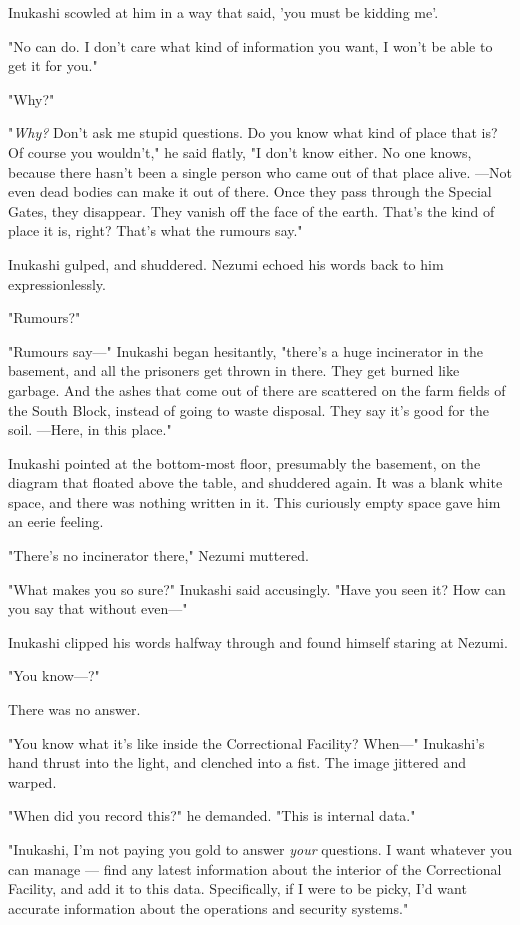 Inukashi scowled at him in a way that said, 'you must be kidding me'.

"No can do. I don't care what kind of information you want, I won't be
able to get it for you."

"Why?"

"\emph{Why?} Don't ask me stupid questions. Do you know what kind of place that
is? Of course you wouldn't," he said flatly, "I don't know either. No
one knows, because there hasn't been a single person who came out of
that place alive. ---Not even dead bodies can make it out of there. Once
they pass through the Special Gates, they disappear. They vanish off the
face of the earth. That's the kind of place it is, right? That's what
the rumours say."

Inukashi gulped, and shuddered. Nezumi echoed his words back to him
expressionlessly.

"Rumours?"

"Rumours say---" Inukashi began hesitantly, "there's a huge incinerator in
the basement, and all the prisoners get thrown in there. They get burned
like garbage. And the ashes that come out of there are scattered on the
farm fields of the South Block, instead of going to waste disposal. They
say it's good for the soil. ---Here, in this place."

Inukashi pointed at the bottom-most floor, presumably the basement, on
the diagram that floated above the table, and shuddered again. It was a
blank white space, and there was nothing written in it. This curiously
empty space gave him an eerie feeling.

"There's no incinerator there," Nezumi muttered.

"What makes you so sure?" Inukashi said accusingly. "Have you seen it?
How can you say that without even---"

Inukashi clipped his words halfway through and found himself staring at
Nezumi.

"You know---?"

There was no answer.

"You know what it's like inside the Correctional Facility? When---"
Inukashi's hand thrust into the light, and clenched into a fist. The
image jittered and warped.

"When did you record this?" he demanded. "This is internal data."

"Inukashi, I'm not paying you gold to answer \emph{your} questions. I want
whatever you can manage --- find any latest information about the interior
of the Correctional Facility, and add it to this data. Specifically, if
I were to be picky, I'd want accurate information about the operations
and security systems."

